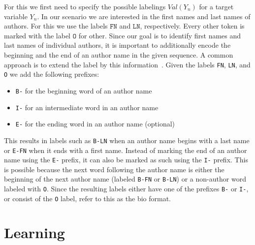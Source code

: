 For this we first need to specify the possible labelings $Val(Y_n)$ for a \gls{target variable} $Y_n$.
In our scenario we are interested in the first names and last names of authors.
For this we use the labels $\texttt{FN}$ and $\texttt{LN}$, respectively.
Every other token is marked with the label $\texttt{O}$ for other.
Since our goal is to identify first names and last names of individual authors, it is important to additionally encode the beginning and the end of an author name in the given sequence.
A common approach is to extend the label by this information~\citep{houngbo2012method}.
Given the labels \texttt{FN}, \texttt{LN}, and \texttt{O} we add the following prefixes:
\begin{itemize}
  \item \texttt{B-} for the beginning word of an author name
  \item \texttt{I-} for an intermediate word in an author name
  \item \texttt{E-} for the ending word in an author name (optional)
\end{itemize}
This results in labels such as \texttt{B-LN} when an author name begins with a last name or \texttt{E-FN} when it ends with a first name.
Instead of marking the end of an author name using the \texttt{E-} prefix, it can also be marked as such using the \texttt{I-} prefix.
This is possible because the next word following the author name is either the beginning of the next author name (labeled \texttt{B-FN} or \texttt{B-LN}) or a non-author word labeled with \texttt{O}.
Since the resulting labels either have one of the prefixes \texttt{B-} or \texttt{I-}, or consist of the \texttt{O} label, \citet{houngbo2012method} refer to this as the \gls{bio} format.


\section{Learning }\label{sec:ae-learning-crfs}

